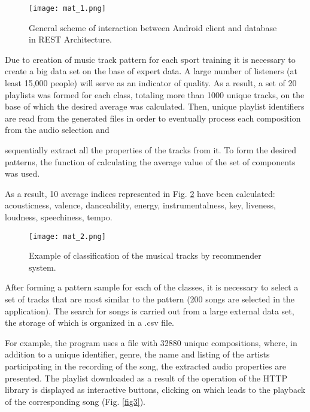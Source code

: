 \documentclass[10pt, a4paper]{article}
\begin{document}
\begin{multicols}{2}
\vspace{0.5em}
\begin{figure}[H]
\centering
\texttt{[image: mat\_1.png]}
\caption{\footnotesize  General scheme of interaction between Android client and
database in REST Architecture.}
\label{fig1}
\end{figure}

\vspace{-0.5em}

\normalsize Due to creation of music track pattern for each sport
training it is necessary to create a big data set on the base
of expert data. A large number of listeners (at least 15,000
people) will serve as an indicator of quality. As a result, a
set of 20 playlists was formed for each class, totaling more
than 1000 unique tracks, on the base of which the desired
average was calculated. Then, unique playlist identifiers
are read from the generated files in order to eventually
process each composition from the audio selection and
\columnbreak

\noindent sequentially extract all the properties of the tracks from it. To form the desired patterns, the function of calculating the average value of the set of components was used.\par
As a result, 10 average indices represented in
Fig. \ref{fig2} have been calculated: acousticness, valence,
danceability, energy, instrumentalness, key, liveness,
loudness, speechiness, tempo.

\vspace{-0.5em}
\begin{figure}[H]
\centering
\texttt{[image: mat\_2.png]}
\caption{\footnotesize Example of classification of the musical tracks by recommender
system.}
\label{fig2}
\end{figure}
\vspace{-0.8em}

\normalsize After forming a pattern sample for each of the classes,
it is necessary to select a set of tracks that are most similar
to the pattern (200 songs are selected in the application).
The search for songs is carried out from a large external
data set, the storage of which is organized in a .csv file.\par
For example, the program uses a file with 32880 unique
compositions, where, in addition to a unique identifier,
genre, the name and listing of the artists participating in
the recording of the song, the extracted audio properties
are presented. The playlist downloaded as a result of the
operation of the HTTP library is displayed as interactive
buttons, clicking on which leads to the playback of the
corresponding song (Fig. \ref{fig3}).


\end{multicols}
\end{document}
